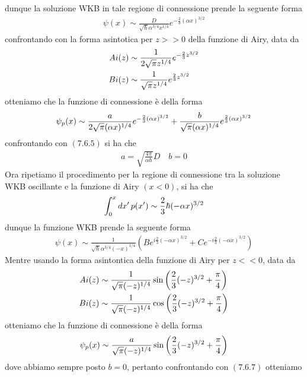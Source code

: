 \documentclass{article}
\begin{document}
dunque la soluzione WKB in tale regione di connessione prende la seguente forma
\begin{gather}
    \psi(x) \sim \frac{D}{\sqrt{\hbar}\alpha^{3/4}x^{1/4}}e^{-\frac{2}{3}(\alpha x)^{3/2}} \tag{7.6.5}
\end{gather}
confrontando con la forma asintotica per $z >> 0$ della funzione di Airy, data da
\begin{align}
    Ai(z) &\sim \frac{1}{2\sqrt{\pi}z^{1/4}}e^{-\frac{2}{3}z^{3/2}} \notag \\
    Bi(z) &\sim \frac{1}{\sqrt{\pi}z^{1/4}}e^{\frac{2}{3}z^{3/2}} \notag
\end{align}
otteniamo che la funzione di connessione è della forma
\begin{gather}
    \psi_p(x) \sim \frac{a}{2\sqrt{\pi}(\alpha x)^{1/4}}e^{-\frac{2}{3}(\alpha x)^{3/2}} + \frac{b}{\sqrt{\pi}(\alpha x)^{1/4}}e^{\frac{2}{3}(\alpha x)^{3/2}} \notag
\end{gather}
confrontando con $(7.6.5)$ si ha che
\begin{gather}
    a = \sqrt{\frac{4\pi}{\alpha\hbar}}D \quad b = 0 \tag{7.6.6}
\end{gather}
Ora ripetiamo il procedimento per la regione di connessione tra la soluzione WKB oscillante e la funzione di Airy $(x < 0)$, si ha che
\begin{gather}
    \int_0^x dx' \, p(x') \sim \frac{2}{3}\hbar(-\alpha x)^{3/2} \notag
\end{gather}
dunque la funzione WKB prende la seguente forma
\begin{gather}
    \psi(x) \sim \frac{1}{\sqrt{\hbar}\alpha^{3/4}(-x)^{1/4}}\left( Be^{i\frac{2}{3}(-\alpha x)^{3/2}} + Ce^{-i\frac{2}{3}(-\alpha x)^{3/2}} \right) \tag{7.6.7}
\end{gather}
Mentre usando la forma asintontica della funzione di Airy per $z << 0$, data da
\begin{align}
    Ai(z) &\sim \frac{1}{\sqrt{\pi}(-z)^{1/4}}\sin\left( \frac{2}{3}(-z)^{3/2} + \frac{\pi}{4} \right) \notag \\
    Bi(z) &\sim \frac{1}{\sqrt{\pi}(-z)^{1/4}}\cos\left( \frac{2}{3}(-z)^{3/2} + \frac{\pi}{4} \right) \notag
\end{align}
otteniamo che la funzione di connessione è della forma
\begin{gather}
    \psi_p(x) \sim \frac{a}{\sqrt{\pi}(-z)^{1/4}}\sin\left( \frac{2}{3}(-z)^{3/2} + \frac{\pi}{4} \right) \notag
\end{gather}
dove abbiamo sempre posto $b = 0$, pertanto confrontando con $(7.6.7)$ otteniamo
\end{document}
